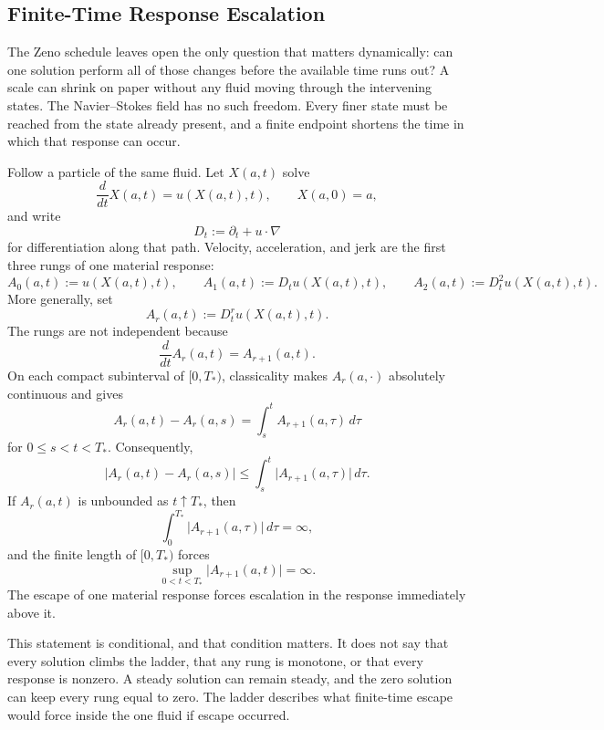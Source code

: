 
\subsection{Finite-Time Response Escalation}\label{sub:FiniteTimeResponseEscalation}

The Zeno schedule leaves open the only question that matters dynamically: can one solution perform all of those changes before the available time runs out?
A scale can shrink on paper without any fluid moving through the intervening states.
The Navier--Stokes field has no such freedom.
Every finer state must be reached from the state already present, and a finite endpoint shortens the time in which that response can occur.

Follow a particle of the same fluid.
Let \(X(a,t)\) solve
\[
  \frac{d}{dt}X(a,t)=u(X(a,t),t),
  \qquad
  X(a,0)=a,
\]
and write
\[
  D_t:=\partial_t+u\cdot\nabla
\]
for differentiation along that path.
Velocity, acceleration, and jerk are the first three rungs of one material response:
\[
  A_0(a,t):=u(X(a,t),t),
  \qquad
  A_1(a,t):=D_tu(X(a,t),t),
  \qquad
  A_2(a,t):=D_t^2u(X(a,t),t).
\]
More generally, set
\[
  A_r(a,t):=D_t^r u(X(a,t),t).
\]
The rungs are not independent because
\[
  \frac{d}{dt}A_r(a,t)=A_{r+1}(a,t).
\]
On each compact subinterval of \([0,T_*)\), classicality makes \(A_r(a,\cdot)\) absolutely continuous and gives
\[
  A_r(a,t)-A_r(a,s)
  =
  \int_s^t A_{r+1}(a,\tau)\,d\tau
\]
for \(0\le s<t<T_*\).
Consequently,
\[
  \lvert A_r(a,t)-A_r(a,s)\rvert
  \le
  \int_s^t \lvert A_{r+1}(a,\tau)\rvert\,d\tau.
\]
If \(A_r(a,t)\) is unbounded as \(t\uparrow T_*\), then
\[
  \int_0^{T_*}\lvert A_{r+1}(a,\tau)\rvert\,d\tau
  =
  \infty,
\]
and the finite length of \([0,T_*)\) forces
\[
  \sup_{0<t<T_*}\lvert A_{r+1}(a,t)\rvert
  =
  \infty.
\]
The escape of one material response forces escalation in the response immediately above it.

This statement is conditional, and that condition matters.
It does not say that every solution climbs the ladder, that any rung is monotone, or that every response is nonzero.
A steady solution can remain steady, and the zero solution can keep every rung equal to zero.
The ladder describes what finite-time escape would force inside the one fluid if escape occurred.

